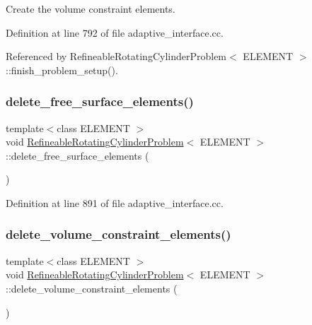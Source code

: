 Create the volume constraint elements. 



Definition at line 792 of file adaptive\+\_\+interface.\+cc.



Referenced by Refineable\+Rotating\+Cylinder\+Problem$<$ E\+L\+E\+M\+E\+N\+T $>$\+::finish\+\_\+problem\+\_\+setup().

\mbox{\label{classRefineableRotatingCylinderProblem_ada026864153cf9954011bcea592cc5b7}} 
\subsubsection{\texorpdfstring{delete\+\_\+free\+\_\+surface\+\_\+elements()}{delete\_free\_surface\_elements()}}
{\footnotesize\ttfamily template$<$class E\+L\+E\+M\+E\+NT $>$ \\
void \hyperlink{classRefineableRotatingCylinderProblem}{Refineable\+Rotating\+Cylinder\+Problem}$<$ E\+L\+E\+M\+E\+NT $>$\+::delete\+\_\+free\+\_\+surface\+\_\+elements (\begin{DoxyParamCaption}{ }\end{DoxyParamCaption})\hspace{0.3cm}{\ttfamily [inline]}}



Definition at line 891 of file adaptive\+\_\+interface.\+cc.

\mbox{\label{classRefineableRotatingCylinderProblem_a37cc1af7c83c5c1b7ae57f7f434be2f1}} 
\subsubsection{\texorpdfstring{delete\+\_\+volume\+\_\+constraint\+\_\+elements()}{delete\_volume\_constraint\_elements()}}
{\footnotesize\ttfamily template$<$class E\+L\+E\+M\+E\+NT $>$ \\
void \hyperlink{classRefineableRotatingCylinderProblem}{Refineable\+Rotating\+Cylinder\+Problem}$<$ E\+L\+E\+M\+E\+NT $>$\+::delete\+\_\+volume\+\_\+constraint\+\_\+elements (\begin{DoxyParamCaption}{ }\end{DoxyParamCaption})\hspace{0.3cm}{\ttfamily [inline]}}



